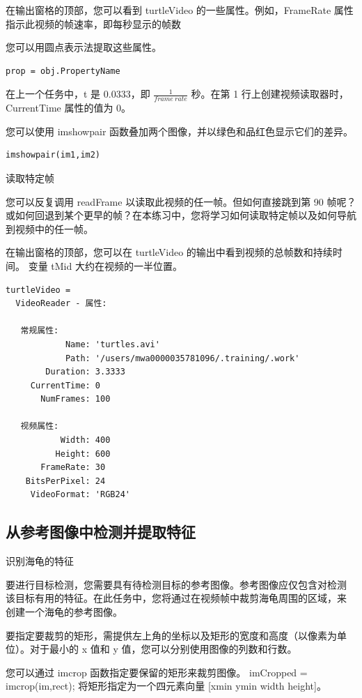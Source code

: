 \documentclass[12pt,a4paper]{article}
\begin{document}
在输出窗格的顶部，您可以看到 turtleVideo 的一些属性。例如，FrameRate 
属性指示此视频的帧速率，即每秒显示的帧数

您可以用圆点表示法提取这些属性。

\begin{lstlisting}
prop = obj.PropertyName
\end{lstlisting}

在上一个任务中，t 是 0.0333，即 $\frac{1}{frame~rate}$
 秒。在第 1 行上创建视频读取器时，CurrentTime 属性的值为 0。

您可以使用 imshowpair 函数叠加两个图像，并以绿色和品红色显示它们的差异。

\begin{lstlisting}
imshowpair(im1,im2)
\end{lstlisting}

读取特定帧

您可以反复调用 readFrame 以读取此视频的任一帧。但如何直接跳到第 90 帧呢？
或如何回退到某个更早的帧？在本练习中，您将学习如何读取特定帧以及如何导航
到视频中的任一帧。

在输出窗格的顶部，您可以在 turtleVideo 的输出中看到视频的总帧数和持续时间。
变量 tMid 大约在视频的一半位置。

\begin{lstlisting}
turtleVideo = 
  VideoReader - 属性:

   常规属性:
            Name: 'turtles.avi'
            Path: '/users/mwa0000035781096/.training/.work'
        Duration: 3.3333
     CurrentTime: 0
       NumFrames: 100

   视频属性:
           Width: 400
          Height: 600
       FrameRate: 30
    BitsPerPixel: 24
     VideoFormat: 'RGB24'
\end{lstlisting}

\subsection{从参考图像中检测并提取特征}

识别海龟的特征

要进行目标检测，您需要具有待检测目标的参考图像。参考图像应仅包含对检测
该目标有用的特征。在此任务中，您将通过在视频帧中裁剪海龟周围的区域，来
创建一个海龟的参考图像。

要指定要裁剪的矩形，需提供左上角的坐标以及矩形的宽度和高度（以像素为单
位）。对于最小的 x 值和 y 值，您可以分别使用图像的列数和行数。

您可以通过 imcrop 函数指定要保留的矩形来裁剪图像。
imCropped = imcrop(im,rect);
将矩形指定为一个四元素向量 [xmin ymin width height]。
\end{document}
